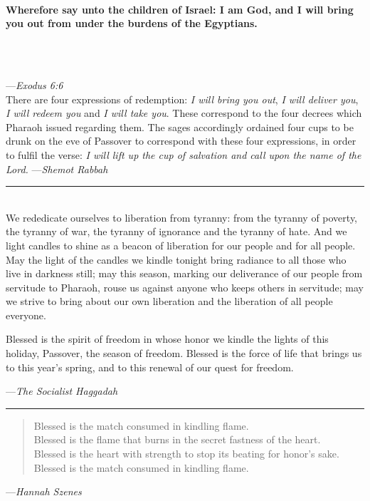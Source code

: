 \documentclass[a4paper,10pt,openany]{memoir}
\newcommand{\HgSource}[1]{\hfill{\small---\itshape{#1}}}
\newcommand{\HgHL}[1]{{\Large\bfseries#1\par\noindent\\[-.5em]}}
\newcommand{\HgFill}{\vfill \hrule \vfill}
\newenvironment{HgEnglish}{\strut\\\noindent}{\vspace{1em}}
\begin{document}
\begin{HgEnglish}
  \HgHL{
  Wherefore say unto the children of Israel: I am God, and I will bring you out
  from under the burdens of the Egyptians.}\\[-3em]

  \HgSource{Exodus 6:6}\\

  \noindent There are four expressions of redemption: {\itshape I will bring you
  out}, {\itshape I will deliver you}, {\itshape I will redeem you} and
  {\itshape I will take you}. These correspond to the four decrees which Pharaoh
  issued regarding them. The sages accordingly ordained four cups to be drunk on
  the eve of Passover to correspond with these four expressions, in order to
  fulfil the verse: {\itshape I will lift up the cup of salvation and call upon
  the name of the Lord.}
  \HgSource{Shemot Rabbah}
\end{HgEnglish}

\HgFill

\begin{HgEnglish}
  We rededicate ourselves to liberation from tyranny: from the tyranny of
  poverty, the tyranny of war, the tyranny of ignorance and the tyranny of hate.
  And we light candles to shine as a beacon of liberation for our people and for
  all people. May the light of the candles we kindle tonight bring radiance to
  all those who live in darkness still; may this season, marking our deliverance
  of our people from servitude to Pharaoh, rouse us against anyone who keeps
  others in servitude; may we strive to bring about our own liberation and the
  liberation of all people everyone.

  Blessed is the spirit of freedom in whose honor we kindle the lights of this
  holiday, Passover, the season of freedom. Blessed is the force of life that
  brings us to this year’s spring, and to this renewal of our quest for freedom.

  \HgSource{The Socialist Haggadah}
\end{HgEnglish}

\HgFill

\begin{verse}
  \small
  Blessed is the match consumed in kindling flame. \\
  Blessed is the flame that burns in the secret fastness of the heart. \\
  Blessed is the heart with strength to stop its beating for honor's sake. \\
  Blessed is the match consumed in kindling flame.
\end{verse}
\HgSource{Hannah Szenes}
\end{document}
